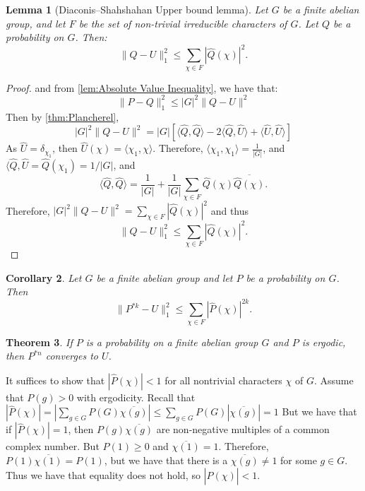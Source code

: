 \documentclass[]{article}
\newtheorem{theorem}{Theorem}
\newtheorem{corollary}[theorem]{Corollary}
\newtheorem{lemma}[theorem]{Lemma}
\theoremstyle{definition}
\numberwithin{theorem}{section}
\numberwithin{equation}{section}
\begin{document}
\begin{lemma}[Diaconis–Shahshahan Upper bound lemma]
	\label{lem:Upper bound lemma}
	Let $G$ be a finite abelian group, and let $F$ be the set of non-trivial irreducible characters of $G$. Let $Q$ be a probability on $G$.  Then:
	\begin{equation}
		\|Q - U\|^2_{1} \leq \sum_{\chi \in F} |\widehat{Q}(\chi)|^2.
	\end{equation}
\end{lemma}
\begin{proof}[Proof]

	and from \cref{lem:Absolute Value Inequality}, we have that:
	\begin{equation}
		 \| P - Q\|_1^2 \leq |G|^2 \| Q - U \|^2
	\end{equation}
	Then by \cref{thm:Plancherel},
	\begin{equation}
		|G|^2 \|Q - U \|^2 = |G| \left[ \langle \widehat{Q}, \widehat{Q} \rangle - 2 \langle \widehat{Q}, \widehat{U} \rangle + \langle \widehat{U}, \widehat{U} \rangle \right]
	\end{equation}
	As $\widehat{U} = \delta_{\chi_1}$, then $\widehat{U}(\chi) = \langle \chi_1, \chi \rangle$. 
	Therefore, $\langle \chi_1, \chi_1 \rangle = \frac{1}{|G|}$, and $\langle \widehat{Q}, \widehat{U} = \widehat{Q}(\chi_1) = 1/|G|$, and
	\begin{equation}
		\langle \widehat{Q}, \widehat{Q} \rangle =\frac{1}{|G|} + \frac{1}{|G|} \sum_{\chi \in F} \widehat{Q}(\chi) \overline{\widehat{Q}(\chi)}.
	\end{equation}
	Therefore, $|G|^2 \|Q - U \|^2 =  \sum_{\chi \in F}| \widehat{Q}(\chi)|^2$ and thus 
	\begin{equation}
		\|Q - U\|^2_{1} \leq \sum_{\chi \in F} |\widehat{Q}(\chi)|^2.
	\end{equation}
\end{proof}

\begin{corollary}
	\label{cor:Convolution Inequality}
	Let $G$ be a finite abelian group and let $P$ be a probability on $G$. Then 
	\begin{equation}
	\|P^{\ast k} - U\|^2_{1} \leq \sum_{\chi \in F} |\widehat{P}(\chi)|^{2k}.
\end{equation}
\end{corollary}

\begin{theorem}
	If $P$ is a probability on a finite abelian group $G$ and $P$ is ergodic, then $P^{\ast n}$ converges to $U$.
\end{theorem}
It suffices to show that $|\widehat{P}(\chi)| < 1$ for all nontrivial characters $\chi$ of $G$. Assume that $P(g) > 0$ with ergodicity. Recall that $|\widehat{P}(\chi)| = |\sum_{g \in G} P(G) \overline{\chi(g)}| \leq \sum_{g \in G} P(G) |\overline{\chi(g)}| = 1$ But we have that if $|\widehat{P}(\chi)| = 1$, then $P(g) \overline{\chi(g)}$ are non-negative multiples of a common complex number. But $P(1) \geq 0$ and $\overline{\chi(1)} = 1$. Therefore, $P(1) \overline{\chi(1)} = P(1)$, but we have that there is a $\overline{\chi(g)} \neq 1$ for some $g \in G$. Thus we have that equality does not hold, so $|\widehat{P}(\chi)| < 1$. 
\end{document}
